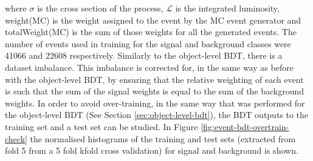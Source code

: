 where $\sigma$ is the cross section of the process, $\mathcal{L}$ is the integrated luminosity, weight(MC) is the weight assigned to the event by the MC event generator and totalWeight(MC) is the sum of those weights for all the generated events. The number of events used in training for the signal and background classes were 41066 and 22608 respectively. Similarly to the object-level BDT, there is a dataset imbalance. This imbalance is corrected for, in the same way as before with the object-level BDT, by ensuring that the relative weighting of each event is such that the sum of the signal weights is equal to the sum of the background weights. In order to avoid over-training, in the same way that was performed for the object-level BDT (See Section \ref{sec:object-level-bdt}), the BDT outputs to the training set and a test set can be studied. In Figure \ref{fig:event-bdt-overtrain-check} the normalised histograms of the training and test sets (extracted from fold 5 from a 5 fold kfold cross validation) for signal and background is shown.

